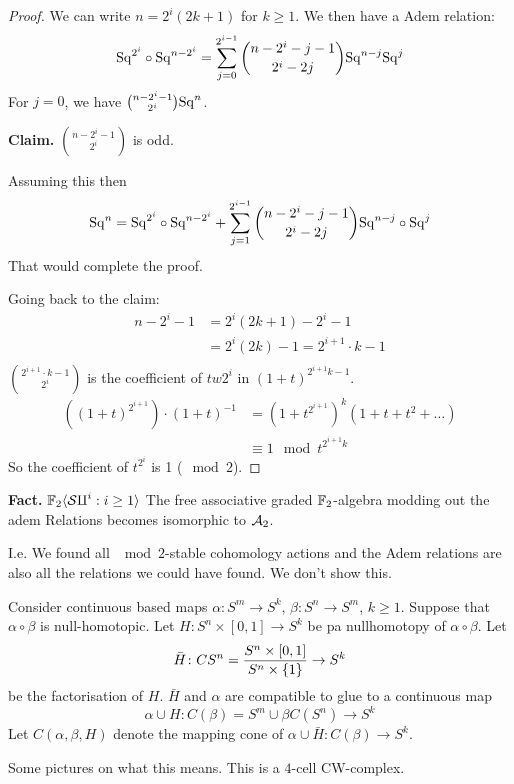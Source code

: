 \documentclass[language=english]{TemplateLecture}
\begin{document}
\begin{proof}
    We can write \(n = 2^i(2k+1)\) for \(k \geq 1\). We then have a Adem relation:
    \[\mathrm{Sq}^{2^i} \circ \mathrm{Sq}^{n-2^i} = \sum_{j = 0}^{2^{i-1}} \binom{n-2^i-j-1}{2^i- 2j}\mathrm{Sq}^{n-j}\mathrm{Sq}^j\]
    For \(j = 0\), we have \(\binom{n-2^i-1}{2^i} \mathrm{Sq}^n\).
    
    \textbf{Claim.} \(\binom{n-2^i-1}{2^i}\) is odd.

    Assuming this then
    \[\mathrm{Sq}^n = \mathrm{Sq}^{2^i}\circ \mathrm{Sq}^{n-2^i} + \sum_{j = 1}^{2^{i-1}} \binom{n-2^i-j-1}{2^i-2j} \mathrm{Sq}^{n-j}\circ \mathrm{Sq}^j\]
    That would complete the proof.

    Going back to the claim:
    \[\begin{split}
        n-2^i - 1 &= 2^i(2k+1)-2^i - 1 \\
        &= 2^i(2k)-1  = 2^{i+1} \cdot k -1 \\
    \end{split}\]
    \(\binom{2^{i+1}\cdot k - 1}{2^i}\) is the coefficient of \(tw{2^i}\) in \((1+t)^{2^{i+1} k-1}\).
    \[\begin{split}
        ((1+t)^{2^{i+1}})\cdot (1+t)^{-1} &= (1+t^{2^{i+1}})^k (1+t+t^2 +\dots) \\
        &\equiv 1 \mod t^{2^{i+1}k}
    \end{split}\]
    So the coefficient of \(t^{2^i}\) is 1 (\(\mod 2\)).
\end{proof}

\textbf{Fact.} \(\mathbb{F}_2\langle\mathcal{Sq}^i : i\geq 1\rangle\) The free associative graded \(\mathbb{F}_2\)-algebra modding out the adem Relations becomes isomorphic to \(\mathcal{A}_2\).

I.e. We found all \(\mod 2\)-stable cohomology actions and the Adem relations are also all the relations we could have found. We don't show this.

\begin{construction}
    Consider continuous based maps \(\alpha\colon S^m\to S^k\), \(\beta\colon S^n\to S^m\), \(k\geq 1\). Suppose that \(\alpha\circ \beta\) is null-homotopic. Let \(H\colon S^n\times [0,1]\to S^k\) be pa nullhomotopy of \(\alpha\circ \beta\). Let
    \[\bar H\colon CS^n= \frac{S^n\times [0,1]}{S^n\times \{1\}} \to S^k\]
    be the factorisation of \(H\). \(\bar H\) and \(\alpha\) are compatible to glue to a continuous map
    \[\alpha\cup H\colon C(\beta) = S^m\cup \beta C(S^n)\to S^k\]
    Let \(C(\alpha,\beta, H)\) denote the mapping cone of \(\alpha \cup \bar H \colon C(\beta) \to S^k\).

    Some pictures on what this means. This is a \(4\)-cell CW-complex.
\end{construction}
\end{document}
